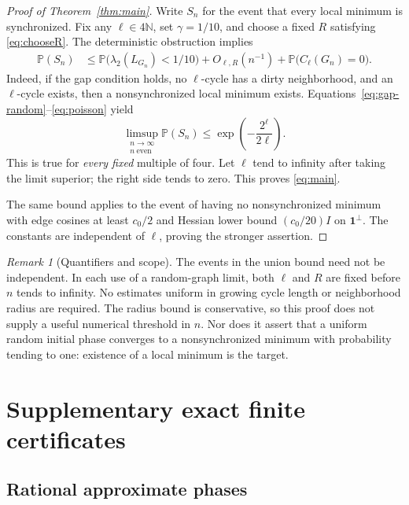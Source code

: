 \documentclass[11pt]{article}
\theoremstyle{definition}
\theoremstyle{remark}
\newtheorem{remark}[theorem]{Remark}
\newcommand{\one}{\mathbf 1}
\newcommand{\Pp}{\mathbb P}
\begin{document}
\begin{proof}[Proof of Theorem~\ref{thm:main}]
Write $S_n$ for the event that every local minimum is synchronized.
Fix any $\ell\in4\mathbb N$, set $\gamma=1/10$, and choose a fixed $R$
satisfying \eqref{eq:chooseR}. The deterministic obstruction implies
\begin{align*}
 \Pp(S_n)
 &\le \Pp\bigl(\lambda_2(L_{G_n})<1/10\bigr)
  +O_{\ell,R}(n^{-1})+\Pp\bigl(C_\ell(G_n)=0\bigr).
\end{align*}
Indeed, if the gap condition holds, no $\ell$-cycle has a dirty neighborhood,
and an $\ell$-cycle exists, then a nonsynchronized local minimum exists.
Equations~\eqref{eq:gap-random}--\eqref{eq:poisson} yield
\begin{equation}\label{eq:limsup}
 \limsup_{\substack{n\to\infty\\n\ \mathrm{even}}}\Pp(S_n)
       \le\exp\!\left(-\frac{2^\ell}{2\ell}\right).
\end{equation}
This is true for \emph{every fixed} multiple of four. Let $\ell$ tend to
infinity after taking the limit superior; the right side tends to zero.
This proves \eqref{eq:main}.

The same bound applies to the event of having no nonsynchronized minimum
with edge cosines at least $c_0/2$ and Hessian lower bound $(c_0/20)I$ on
$\one^\perp$. The constants are independent of $\ell$, proving the stronger
assertion.
\end{proof}

\begin{remark}[Quantifiers and scope]\label{rem:scope}
The events in the union bound need not be independent. In each use of a
random-graph limit, both $\ell$ and $R$ are fixed before $n$ tends to
infinity. No estimates uniform in growing cycle length or neighborhood
radius are required. The radius bound is conservative, so this proof does
not supply a useful numerical threshold in $n$. Nor does it assert that a
uniform random initial phase converges to a nonsynchronized minimum with
probability tending to one: existence of a local minimum is the target.
\end{remark}

\section{Supplementary exact finite certificates}

\subsection{Rational approximate phases}
\end{document}
